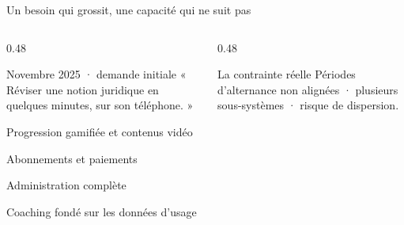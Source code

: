 \begin{frame}{Un besoin qui grossit, une capacité qui ne suit pas}
\begin{columns}[T]
\begin{column}{0.48\linewidth}
\begin{block}{Novembre 2025 · demande initiale}
\small « Réviser une notion juridique en quelques minutes, sur son téléphone. »
\end{block}
\begin{tightitems}
  \item Progression gamifiée et contenus vidéo
  \item Abonnements et paiements
  \item Administration complète
  \item Coaching fondé sur les données d'usage
\end{tightitems}
\end{column}
\begin{column}{0.48\linewidth}
\vspace{0.2em}
\begin{center}
\hfill
{}
\end{center}
\vspace{0.8em}
\begin{block}{La contrainte réelle}
\centering\small Périodes d'alternance non alignées · plusieurs sous-systèmes · risque de dispersion.
\end{block}
\vspace{0.35em}
\small{}
\end{column}
\end{columns}
\end{frame}

